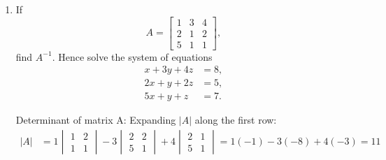 \begin{enumerate}[label=\thesubsection.\arabic*, ref=\thesubsection.\theenumi]
Intersection of lines \eqref{eq:line2} and \eqref{eq:line3}:
Substituting $x = 4$ into equation \eqref{eq:line2}:
\begin{align*}
	y = 3(4) + 1 = 13
\end{align*}
Thus, the vertex is $C(4, 13)$.

In the interval $x \in [0, 4]$, the line $y = 3x + 1$ lies above the line $y = 2x + 1$ since $3x + 1 \ge 2x + 1$ for all $x \ge 0$.

The area $A$ of the region bounded between $x = 0$ and $x = 4$ is:
\begin{align*}
	\text{Area} &= \int_0^4 \left(y_{\text{upper}} - y_{\text{lower}}\right)\,dx 
	= \int_0^4 \left[(3x + 1) - (2x + 1)\right]\,dx \\
	&= \int_0^4 (3x + 1 - 2x - 1)\,dx 
	= \int_0^4 x\,dx
\end{align*}

Evaluating the definite integral:
\begin{align*}
	\text{Area} &= \left[ \frac{x^2}{2} \right]_0^4 
	= \frac{4^2}{2} - 0 
	= \frac{16}{2} 
	= 8\text{ square units}
\end{align*}

Therefore, the area of the triangular region is $8\text{ square units}$.

\item If
 \[
A=\begin{bmatrix}
	1&3&4\\
	2&1&2\\
	5&1&1
\end{bmatrix},
\]
find $A^{-1}$. Hence solve the system of equations
\[
\begin{aligned}
	x+3y+4z&=8,\\
	2x+y+2z&=5,\\
	5x+y+z&=7.
\end{aligned}
\]

\solution
Determinant of matrix A:
Expanding $|A|$ along the first row:
\begin{align*}
	|A| &= 1 \begin{vmatrix} 1 & 2 \\ 1 & 1 \end{vmatrix} - 3 \begin{vmatrix} 2 & 2 \\ 5 & 1 \end{vmatrix} + 4 \begin{vmatrix} 2 & 1 \\ 5 & 1 \end{vmatrix} 
	= 1(-1) - 3(-8) + 4(-3) 
	= 11
\end{align*}


\end{enumerate}
